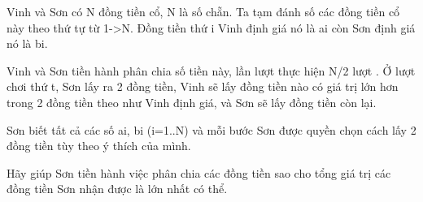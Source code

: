 Vinh và Sơn có N đồng tiền cổ, N là số chẵn. Ta tạm đánh số các đồng tiền cổ này theo thứ tự từ 1->N. Đồng tiền thứ i Vinh định giá nó là ai còn Sơn định giá nó là bi.

Vinh và Sơn tiền hành phân chia số tiền này, lần lượt thực hiện N/2 lượt . Ở lượt chơi thứ t, Sơn lấy ra 2 đồng tiền, Vinh sẽ lấy đồng tiền nào có giá trị lớn hơn trong 2 đồng tiền theo như Vinh định giá, và Sơn sẽ lấy đồng tiền còn lại.

Sơn biết tất cả các số ai, bi (i=1..N) và mỗi bước Sơn được quyền chọn cách lấy 2 đồng tiền tùy theo ý thích của mình.

Hãy giúp Sơn tiền hành việc phân chia các đồng tiền sao cho tổng giá trị các đồng tiền Sơn nhận được là lớn nhất có thể.
